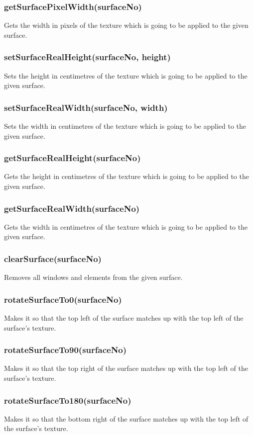 \documentclass{acm_proc_article-sp}
\begin{document}
\subsubsection{getSurfacePixelWidth(surfaceNo)}
Gets the width in pixels of the texture which is going to be applied to the given surface.
\subsubsection{setSurfaceRealHeight(surfaceNo, height)}
Sets the height in centimetres of the texture which is going to be applied to the given surface.
\subsubsection{setSurfaceRealWidth(surfaceNo, width)}
Sets the width in centimetres of the texture which is going to be applied to the given surface.
\subsubsection{getSurfaceRealHeight(surfaceNo)}
Gets the height in centimetres of the texture which is going to be applied to the given surface.
\subsubsection{getSurfaceRealWidth(surfaceNo)}
Gets the width in centimetres of the texture which is going to be applied to the given surface.
\subsubsection{clearSurface(surfaceNo)}
Removes all windows and elements from the given surface.
\subsubsection{rotateSurfaceTo0(surfaceNo)}
Makes it so that the top left of the surface matches up with the top left of the surface's texture.
\subsubsection{rotateSurfaceTo90(surfaceNo)}
Makes it so that the top right of the surface matches up with the top left of the surface's texture.
\subsubsection{rotateSurfaceTo180(surfaceNo)}
Makes it so that the bottom right of the surface matches up with the top left of the surface's texture.
\end{document}
